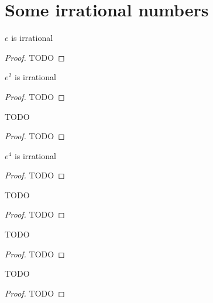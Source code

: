 \chapter{Some irrational numbers}


\begin{theorem}
  \label{e_irrational}
  \leanok
  \(e\) is irrational
\end{theorem}
\begin{proof}
  TODO
\end{proof}

\begin{theorem}
  \label{e_pow_2_irrational}
  \leanok
  \(e ^ 2\) is irrational
\end{theorem}
\begin{proof}
  TODO
\end{proof}


\begin{theorem}
  \label{little_lemma}
  \leanok
  TODO
\end{theorem}
\begin{proof}
  TODO
\end{proof}

\begin{theorem}
  \label{e_pow_4_irrational}
  \leanok
  \(e ^ 4\) is irrational
\end{theorem}
\begin{proof}
  TODO
\end{proof}

\begin{lemma}
  \label{lem_aux_i}
  \leanok
  TODO
\end{lemma}
\begin{proof}
  TODO
\end{proof}

\begin{lemma}
  \label{lem_aux_ii}
  \leanok
  TODO
\end{lemma}
\begin{proof}
  TODO
\end{proof}


\begin{lemma}
  \label{lem_aux_iii}
  \leanok
  TODO
\end{lemma}
\begin{proof}
  TODO
\end{proof}

